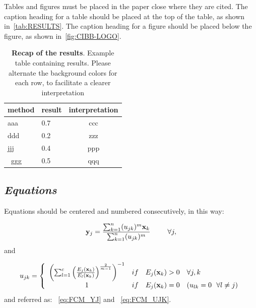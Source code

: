 \documentclass[12pt,a4paper]{cibb}
\begin{document}
Tables and  figures must be placed  in the paper close  where they are
cited.  The caption heading for a table should be placed at the top of
the table,  as shown in~\autoref{tab:RESULTS}.  The caption heading  for a
figure   should   be   placed   below   the  figure,   as   shown   in~\autoref{fig:CIBB-LOGO}.

\begin{table}[httb!] \small
\centering
    \begin{tabularx}{0.4\textwidth}{ l  l  c }
        \toprule
          \textbf{method} & \textbf{result} & \textbf{interpretation} \\
        \midrule
        \rowcolor{LightBlue} aaa & 0.7 & ccc \\
         ddd & 0.2 & zzz \\
        \rowcolor{LightBlue}  jjj & 0.4 & ppp \\\
         ggg & 0.5 & qqq \\
        \bottomrule
    \end{tabularx}
    \caption{\textbf{Recap of the results}.
    Example table containing results.
    Please alternate the background colors for each row, to facilitate a clearer interpretation\label{tab:RESULTS}}
\end{table}





\subsection{\bf \it Equations}
\label{sec:EQUATIONS}


Equations should be centered and numbered consecutively, in this way:

\begin{equation}
{\bf y}_{j} = \frac {\sum_{k=1}^{n} (u_{jk})^{m}{\bf x}_{k} }{
\sum_{k=1}^{n} ({ u}_{jk})^{m} } \, \, \ \mbox{\hspace{.5cm}  } \forall j,
\label{eq:FCM_YJ}
\end{equation}
and

\begin{equation}
u_{jk} =
\left\{
\begin{array}{clll}
\left( \sum_{l=1}^{c} \left( \frac {E_{j}({\bf x}_{k})}{E_{l}({\bf x}_{k})}
\right)^\frac{2}{m-1} \right)^{-1} & if & E_{j}({\bf x}_{k})>0 & \forall j,k \\
1 & if & E_{j}({\bf x}_{k})=0 & (u_{lk}=0 \ \ \forall l \neq j) \\
\end{array}
\right.
\label{eq:FCM_UJK}
\end{equation}
and referred as: ~\autoref{eq:FCM_YJ} and ~\autoref{eq:FCM_UJK}.
\end{document}
